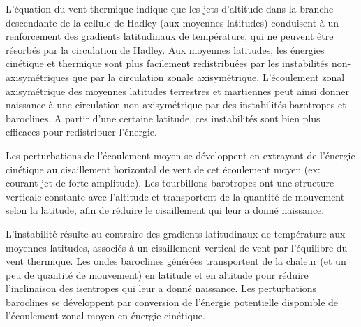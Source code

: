 \sk
L'équation du vent thermique indique que les jets d'altitude dans la branche descendante de la cellule de Hadley (aux moyennes latitudes) conduisent à un renforcement des gradients latitudinaux de température, qui ne peuvent être résorbés par la circulation de Hadley. Aux moyennes latitudes, les énergies cinétique et thermique sont plus facilement redistribuées par les instabilités non-axisymétriques que par la circulation zonale axisymétrique. L'écoulement zonal axisymétrique des moyennes latitudes terrestres et martiennes peut ainsi donner naissance à une circulation non axisymétrique par des instabilités barotropes et baroclines. A partir d'une certaine latitude, ces instabilités sont bien plus efficaces pour redistribuer l'énergie.

\sk
Les perturbations  de l'écoulement moyen se développent en extrayant de l'énergie cinétique au cisaillement horizontal de vent de cet écoulement moyen (ex: courant-jet de forte amplitude). Les tourbillons barotropes ont une structure verticale constante avec l'altitude et transportent de la quantité de mouvement selon la latitude, afin de réduire le cisaillement qui leur a donné naissance.

\sk
L'instabilité  résulte au contraire des gradients latitudinaux de température aux moyennes latitudes, associés à un cisaillement vertical de vent par l'équilibre du vent thermique. Les ondes baroclines générées transportent de la chaleur (et un peu de quantité de mouvement) en latitude et en altitude pour réduire l'inclinaison des isentropes qui leur a donné naissance. Les perturbations baroclines se développent par conversion de l'énergie potentielle disponible de l'écoulement zonal moyen en énergie cinétique.



